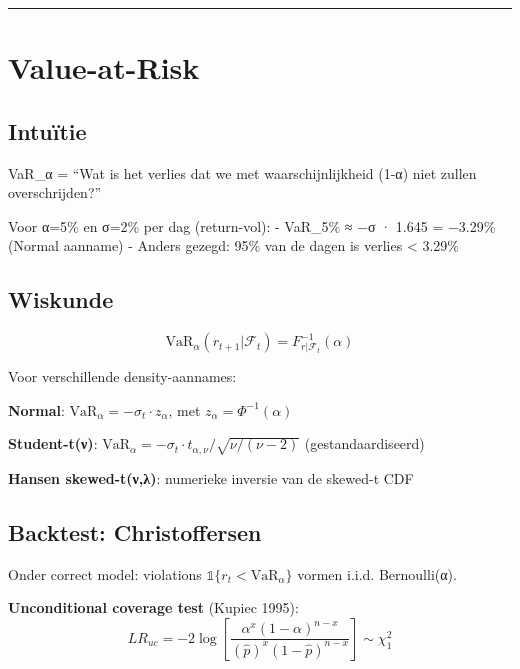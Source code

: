 \begin{center}\rule{0.5\linewidth}{0.5pt}\end{center}

\hypertarget{value-at-risk}{%
\section{Value-at-Risk}\label{value-at-risk}}

\hypertarget{intuuxeftie-9}{%
\subsection{Intuïtie}\label{intuuxeftie-9}}

VaR\_α = ``Wat is het verlies dat we met waarschijnlijkheid (1-α) niet zullen overschrijden?''

Voor α=5\% en σ=2\% per dag (return-vol):
- VaR\_5\% ≈ −σ · 1.645 = −3.29\% (Normal aanname)
- Anders gezegd: 95\% van de dagen is verlies \textless{} 3.29\%

\hypertarget{wiskunde-3}{%
\subsection{Wiskunde}\label{wiskunde-3}}

\[\text{VaR}_\alpha(r_{t+1} | \mathcal{F}_t) = F^{-1}_{r|\mathcal{F}_t}(\alpha)\]

Voor verschillende density-aannames:

\textbf{Normal}: \(\text{VaR}_\alpha = -\sigma_t \cdot z_\alpha\), met \(z_\alpha = \Phi^{-1}(\alpha)\)

\textbf{Student-t(ν)}: \(\text{VaR}_\alpha = -\sigma_t \cdot t_{\alpha,\nu} / \sqrt{\nu/(\nu-2)}\) (gestandaardiseerd)

\textbf{Hansen skewed-t(ν,λ)}: numerieke inversie van de skewed-t CDF

\hypertarget{backtest-christoffersen}{%
\subsection{Backtest: Christoffersen}\label{backtest-christoffersen}}

Onder correct model: violations \(\mathbb{1}\{r_t < \text{VaR}_\alpha\}\) vormen i.i.d. Bernoulli(α).

\textbf{Unconditional coverage test} (Kupiec 1995):
\[LR_{uc} = -2\log\left[\frac{\alpha^x (1-\alpha)^{n-x}}{(\hat p)^x (1-\hat p)^{n-x}}\right] \sim \chi^2_1\]

